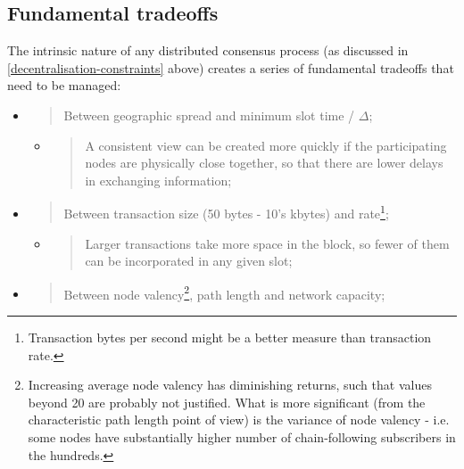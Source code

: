 \documentclass[11pt,a4paper]{article}
\begin{document}
\subsection{Fundamental tradeoffs}
\label{fundamental-tradeoffs}

The intrinsic nature of any distributed consensus process (as discussed
in \cref{decentralisation-constraints} above)
creates a series of fundamental tradeoffs that need to be managed:

\begin{itemize}
\item
  \begin{quote}
  Between geographic spread and minimum slot time / $\Delta$;
  \end{quote}

  \begin{itemize}
  \item
    \begin{quote}
    A consistent view can be created more quickly if the participating
    nodes are physically close together, so that there are lower delays
    in exchanging information;
    \end{quote}
  \end{itemize}
\item
  \begin{quote}
  Between transaction size (50 bytes - 10's kbytes) and rate\footnote{Transaction
    bytes per second might be a better measure than transaction rate.};
  \end{quote}

  \begin{itemize}
  \item
    \begin{quote}
    Larger transactions take more space in the block, so fewer of them
    can be incorporated in any given slot;
    \end{quote}
  \end{itemize}
\item
  \begin{quote}
  Between node valency\footnote{Increasing average node valency has
    diminishing returns, such that values beyond 20 are probably not
    justified. What is more significant (from the characteristic path
    length point of view) is the variance of node valency - i.e. some
    nodes have substantially higher number of chain-following
    subscribers in the hundreds.}, path length and network capacity;
  \end{quote}


\end{itemize}
\end{document}
